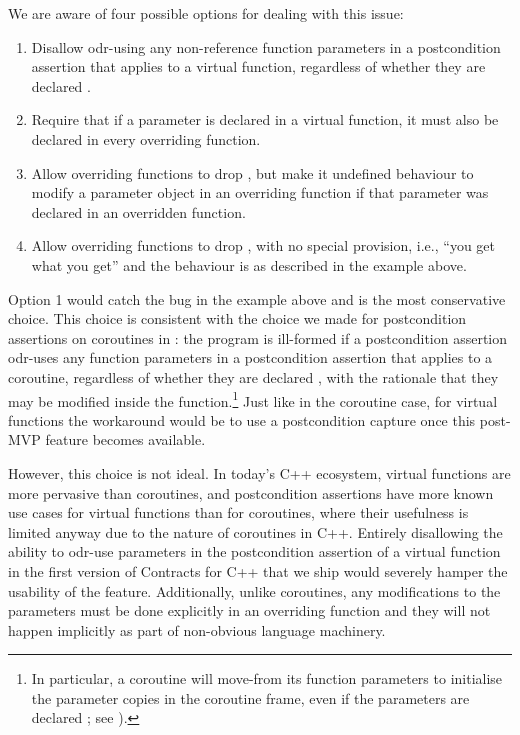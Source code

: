 We are aware of four possible options for dealing with this issue:
\begin{enumerate}
\item Disallow odr-using any non-reference function parameters in a postcondition assertion that applies to a virtual function, regardless of whether they are declared .
\item Require that if a parameter is declared  in a virtual function, it must also be declared  in every overriding function.
\item Allow overriding functions to drop , but make it undefined behaviour to modify a parameter object in an overriding function if that parameter was declared  in an overridden function.
\item Allow overriding functions to drop , with no special provision, i.e., ``you get what you get'' and the behaviour is as described in the example above.
\end{enumerate}
Option 1 would catch the bug in the example above and is the most conservative choice. This choice is consistent with the choice we made for postcondition assertions on coroutines in \cite{P2900R10}: the program is ill-formed if a postcondition assertion odr-uses any function parameters in a postcondition assertion that applies to a coroutine, regardless of whether they are declared , with the rationale that they may be modified inside the function.\footnote{In particular, a coroutine will move-from its function parameters to initialise the parameter copies in the coroutine frame, even if the parameters are declared ; see \cite{P3387R0}).} Just like in the coroutine case, for virtual functions the workaround would be to use a postcondition capture \cite{P3098R0} once this post-MVP feature becomes available.

However, this choice is not ideal. In today's C++ ecosystem, virtual functions are more pervasive than coroutines, and postcondition assertions have more known use cases for virtual functions than for coroutines, where their usefulness is limited anyway due to the nature of coroutines in C++. Entirely disallowing the ability to odr-use parameters in the postcondition assertion of a virtual function in the first version of Contracts for C++ that we ship would severely hamper the usability of the feature.  Additionally, unlike coroutines, any modifications to the parameters must be done explicitly in an overriding function and they will not happen implicitly as part of non-obvious language machinery.


